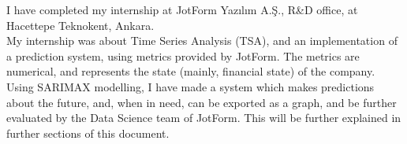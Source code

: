 

I have completed my internship at JotForm Yazılım A.Ş., R\&D office, at Hacettepe Teknokent, Ankara. \\
My internship was about Time Series Analysis (TSA), and an implementation of a prediction system,
using metrics provided by JotForm. The metrics are numerical, and represents the state (mainly, financial state)
of the company. Using SARIMAX modelling, I have made a system which makes predictions about the future,
and, when in need, can be exported as a graph, and be further evaluated by the Data Science team of JotForm. This
will be further explained in further sections of this document.
